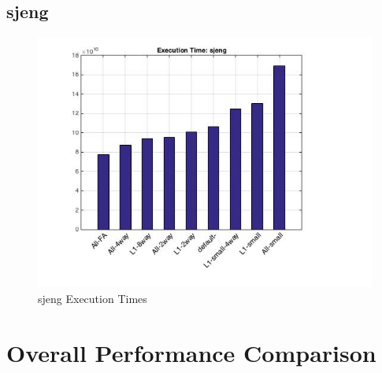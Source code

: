 \documentclass[11pt,titlepage]{article}
\begin{document}
    \subsection{sjeng}
        \begin{figure}[H]
            \centering
            \includegraphics[scale=0.75]{etsjeng}
            \caption{sjeng Execution Times}
            \label{fig:etsjeng}
        \end{figure}

\section{Overall Performance Comparison}
\end{document}

